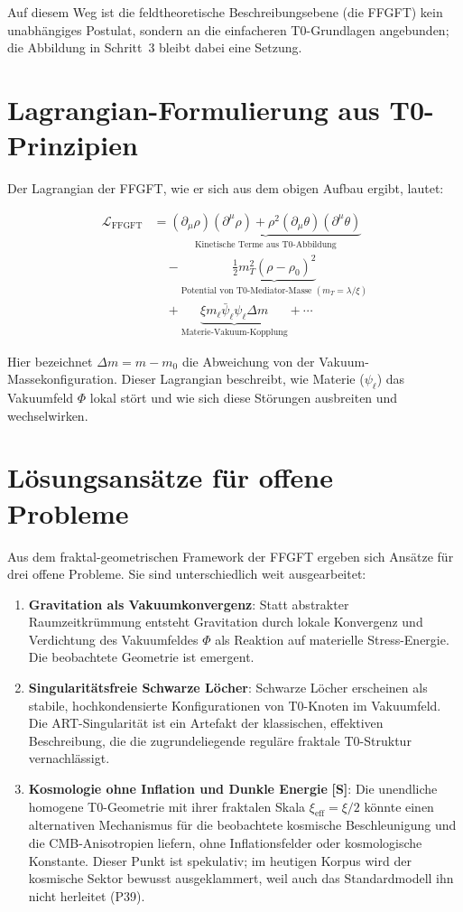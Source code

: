 	Auf diesem Weg ist die feldtheoretische Beschreibungsebene (die FFGFT) kein unabhängiges Postulat, sondern an die einfacheren T0-Grundlagen angebunden; die Abbildung in Schritt~3 bleibt dabei eine Setzung.
	
	\section{Lagrangian-Formulierung aus T0-Prinzipien}
	
	Der Lagrangian der FFGFT, wie er sich aus dem obigen Aufbau ergibt, lautet:
	
	\begin{align}
		\mathcal{L}_{\text{FFGFT}} &= \underbrace{(\partial_\mu \rho)(\partial^\mu \rho) + \rho^2 (\partial_\mu \theta)(\partial^\mu \theta)}_{\text{Kinetische Terme aus T0-Abbildung}} \\
		&\quad - \underbrace{\frac{1}{2} m_T^2 (\rho - \rho_0)^2}_{\text{Potential von T0-Mediator-Masse } (m_T = \lambda / \xi)} \\
		&\quad + \underbrace{\xi m_\ell \bar{\psi}_\ell \psi_\ell \Delta m}_{\text{Materie-Vakuum-Kopplung}} + \cdots
	\end{align}
	
	Hier bezeichnet $\Delta m = m - m_0$ die Abweichung von der Vakuum-Massekonfiguration. Dieser Lagrangian beschreibt, wie Materie ($\psi_\ell$) das Vakuumfeld $\Phi$ lokal stört und wie sich diese Störungen ausbreiten und wechselwirken.
	
	\section{Lösungsansätze für offene Probleme}

	Aus dem fraktal-geometrischen Framework der FFGFT ergeben sich Ansätze für drei offene Probleme. Sie sind unterschiedlich weit ausgearbeitet:
	
	\begin{enumerate}
		\item \textbf{Gravitation als Vakuumkonvergenz}: Statt abstrakter Raumzeitkrümmung entsteht Gravitation durch lokale Konvergenz und Verdichtung des Vakuumfeldes $\Phi$ als Reaktion auf materielle Stress-Energie. Die beobachtete Geometrie ist emergent.
		\item \textbf{Singularitätsfreie Schwarze Löcher}: Schwarze Löcher erscheinen als stabile, hochkondensierte Konfigurationen von T0-Knoten im Vakuumfeld. Die ART-Singularität ist ein Artefakt der klassischen, effektiven Beschreibung, die die zugrundeliegende reguläre fraktale T0-Struktur vernachlässigt.
		\item \textbf{Kosmologie ohne Inflation und Dunkle Energie} \textbf{[S]}: Die unendliche homogene T0-Geometrie mit ihrer fraktalen Skala $\xi_{\text{eff}} = \xi/2$ könnte einen alternativen Mechanismus für die beobachtete kosmische Beschleunigung und die CMB-Anisotropien liefern, ohne Inflationsfelder oder kosmologische Konstante. Dieser Punkt ist spekulativ; im heutigen Korpus wird der kosmische Sektor bewusst ausgeklammert, weil auch das Standardmodell ihn nicht herleitet (P39).
	\end{enumerate}
	
